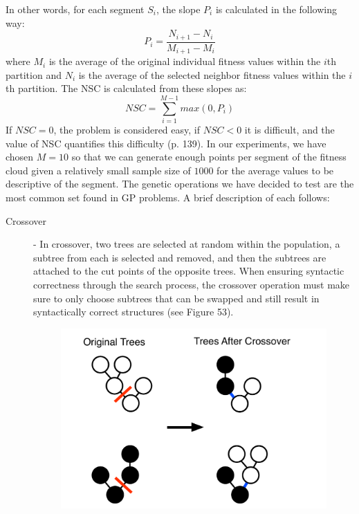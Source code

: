 \documentclass[12pt]{report} 	%
\numberwithin{figure}{chapter}
\numberwithin{table}{chapter}
\numberwithin{equation}{chapter}
\begin{document}
\begin{flushleft}
In other words, for each segment $S_i$, the slope $P_i$ is calculated in the following way:
\begin{equation}
P_i = \frac{N_{i+1}-N_i}{M_{i+1}-M_i}
\end{equation}
where $M_i$ is the average of the original individual fitness values within the $i$th partition and $N_i$ is the average of the selected neighbor fitness values within the $i$th partition. The NSC is calculated from these slopes as:
\begin{equation}
NSC = \sum_{i=1}^{M-1} max(0, P_i)
\end{equation}
If $NSC = 0$, the problem is considered easy, if $NSC < 0$ it is difficult, and the value of NSC quantifies this difficulty (p. 139). In our experiments, we have chosen $M=10$ so that we can generate enough points per segment of the fitness cloud given a relatively small sample size of $1000$ for the average values to be descriptive of the segment.
The genetic operations we have decided to test are the most common set found in GP problems. A brief description of each follows:
\begin{description}
\item [Crossover] - In crossover, two trees are selected at random within the population, a subtree from each is selected and removed, and then the subtrees are attached to the cut points of the opposite trees. When ensuring syntactic correctness through the search process, the crossover operation must make sure to only choose subtrees that can be swapped and still result in syntactically correct structures (see Figure 53). 
\begin{figure}[h!]
\begin{center}
\includegraphics[scale=0.5]{Crossover}

\end{center}
\end{figure}
\end{description}
\end{flushleft}
\end{document}
